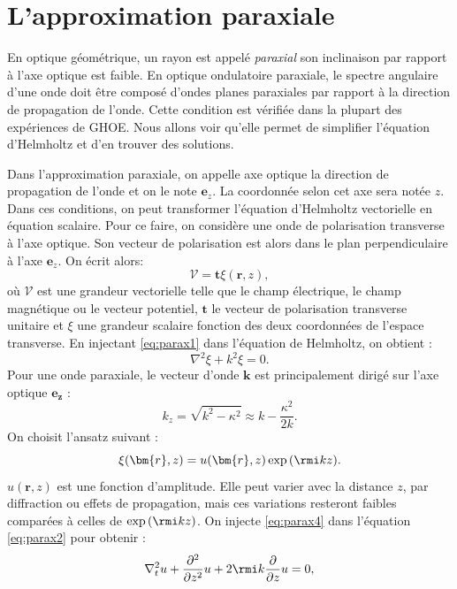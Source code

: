 \section{L'approximation paraxiale}
En optique géométrique, un rayon est appelé \textit{paraxial} son inclinaison par rapport à l'axe optique est faible. En optique ondulatoire paraxiale, le spectre angulaire d'une onde doit être composé d'ondes planes paraxiales par rapport à la direction de propagation de l'onde. Cette condition est vérifiée dans la plupart des expériences de GHOE. Nous allons voir qu'elle permet de simplifier l'équation d'Helmholtz et d'en trouver des solutions.\par
Dans l'approximation paraxiale, on appelle axe optique la direction de propagation de l'onde et on le note $\bm{e}_z$. La coordonnée selon cet axe sera notée $z$. Dans ces conditions, on peut transformer l'équation d'Helmholtz vectorielle en équation scalaire.  Pour ce faire, on considère une onde de polarisation transverse à l'axe optique. Son vecteur de polarisation est alors dans le plan perpendiculaire à l'axe $\bm{e}_z$. On écrit alors:
\begin{equation}
\bm{\mathcal{V}}=\bm{t}\xi(\bm{r},z),
\label{eq:parax1}
\end{equation}
où $\bm{\mathcal{V}}$ est une grandeur vectorielle telle que le champ électrique, le champ magnétique ou le vecteur potentiel, $\bm{t}$ le vecteur de polarisation transverse unitaire et $\xi$ une grandeur scalaire fonction des deux coordonnées de l'espace transverse. En injectant \ref{eq:parax1} dans l'équation de Helmholtz, on obtient :
\begin{equation}
\nabla^2{\xi}+k^2{\xi}=0.
\label{eq:parax2}
\end{equation}
Pour une onde paraxiale, le vecteur d'onde $\bm{k}$ est principalement dirigé sur l'axe optique $\bm{e_z}$ :
\begin{equation}
k_z = \sqrt{k^2-\kappa^2}\approx k-\frac{\kappa^2}{2k}.
\label{eq:parax3}
\end{equation}
On choisit l'ansatz suivant :
\begin{equation}
\xi(\bm{r},z)=u(\bm{r},z)\exp{(\rmi k z)}.
\label{eq:parax4}
\end{equation}
$u(\bm{r},z)$ est une fonction d'amplitude. Elle peut varier avec la distance $z$, par diffraction ou effets de propagation, mais ces variations resteront faibles comparées à celles de $\exp{(\rmi k z)}$. On injecte \ref{eq:parax4} dans l'équation \ref{eq:parax2} pour obtenir :
\begin{equation}
\nabla_t^2 u+\frac{\partial^2}{\partial z^2} u + 2\rmi k \frac{\partial}{\partial z} u =0,
\label{eq:parax5}
\end{equation}
